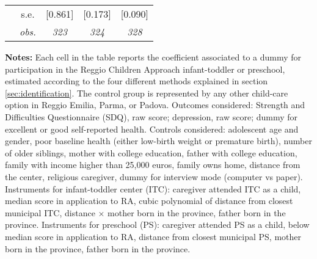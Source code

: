 \begin{table}[H]
\begin{centering}
\begin{tabular}{ r c ccc}
	 & s.e.	 & [0.861]	 & [0.173]	 & [0.090]	\\
	 & \textit{obs.}	 & \textit{323}	 & \textit{324}	 & \textit{328}	\\
\hline 
\end{tabular} 
\par\end{centering} 
\vspace{2ex}
\begin{footnotesize} 
\textbf{Notes:} Each cell in the table reports the coefficient associated to a dummy for participation in the Reggio Children Approach infant-toddler or preschool, estimated according to the four different methods explained in section  \ref{sec:identification}.
The control group is represented by any other child-care option in Reggio Emilia, Parma, or Padova.
Outcomes considered: Strength and Difficulties Questionnaire (SDQ), raw score; depression, raw score; dummy for excellent or good self-reported health. Controls considered: adolescent age and gender, poor baseline health (either low-birth weight or premature birth), number of older siblings, mother with college education, father with college education, family with income higher than 25,000 euros, family owns home, distance from the center, religious caregiver, dummy for interview mode (computer vs paper). 
Instruments for infant-toddler center (ITC): caregiver attended ITC as a child, median score in application to RA, cubic polynomial of distance from closest municipal ITC, distance $\times$ mother born in the province, father born in the province.
Instruments for preschool (PS): caregiver attended PS as a child, below median score in application to RA, distance from closest municipal PS, mother born in the province, father born in the province.
\end{footnotesize}
\end{table}
